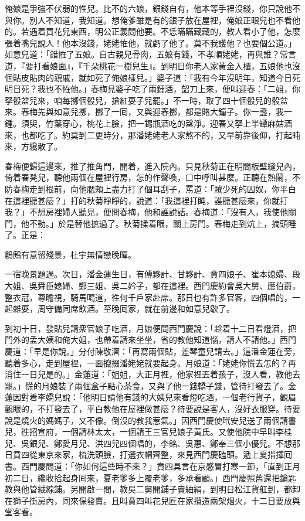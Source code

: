 俺娘是爭強不伏弱的性兒。比不的六娘，銀錢自有，他本等手裡沒錢，你只說他不與你。別人不知道，我知道。{}想俺爹雖是有的銀子放在屋裡，俺娘正眼兒也不看他的。若遇着買花兒東西，明公正義問他要。不恁瞞瞞藏藏的，教人看小了他，怎麼張着嘴兒說人！他本沒錢，姥姥恠他，就虧了他了。莫不我護他？也要個公道。」{}如意兒道：「錯恠了五娘。自古親兒骨肉，五娘有錢，不孝順姥姥，再與誰？常言道，『要打看娘面』，『千朵桃花一樹兒生』。{}到明日你老人家黃金入櫃，五娘他也沒個貼皮貼肉的親戚，就如死了俺娘樣兒。」婆子道：「我有今年沒明年，知道今日死明日死？我也不恠他。」春梅見婆子吃了兩鍾酒，韶刀上來，便叫迎春：「二姐，你拏骰盆兒來，咱每擲個骰兒，搶紅耍子兒罷。」不一時，取了四十個骰兒的骰盆來。春梅先與如意兒擲，擲了一囘，又與迎春擲，都是賭大鐘子。你一盞，我一鍾。須臾，竹葉穿心，桃花上臉，把一錫瓶酒吃的罄淨。{}迎春又拏上半罈麻姑酒來，也都吃了。約莫到二更時分，那潘姥姥老人家熬不的，又早前靠後仰，打起盹來，方纔散了。

春梅便歸這邊來，推了推角門，開着，進入院內。只見秋菊正在明間板壁縫兒內，倚着春凳兒，聽他兩個在屋裡行房，怎的作聲喚，口中呼叫甚麼。正聽在熱鬧，不防春梅走到根前，向他腮頰上盡力打了個耳刮子，罵道：「賊少死的囚奴，你平白在這裡聽甚麼？」打的秋菊睜睜的，說道：「我這裡打盹，誰聽甚麼來，你就打我？」不想房裡婦人聽見，便問春梅，他和誰說話。春梅道：「沒有人，我使他關門，他不動。」於是替他摭過了。秋菊揉着眼，關上房門。春梅走到炕上，摘頭睡了。正是：

\begin{myquote}
鶬鶊有意留殘景，杜宇無情戀晚暉。
\end{myquote}

一宿晚景題過。次日，潘金蓮生日，有傅夥計、甘夥計、賁四娘子、崔本媳婦、段大姐、吳舜臣媳婦、鄭三姐、吳二妗子，都在這裡。西門慶約會吳大舅、應伯爵，整衣冠，尊瞻視，騎馬喝道，徃何千戶家赴席。那日也有許多官客，四個唱的，一起雜耍，周守備同席飲酒。至晚囘家，就在前邊和如意兒歇了。

到初十日，發貼兒請衆官娘子吃酒，月娘便問西門慶說：「趁着十二日看燈酒，把門外的孟大姨和俺大姐，也帶着請來坐坐，省的教他知道惱，請人不請他。」西門慶道：「早是你說。」分付陳敬濟：「再寫兩個貼，差琴童兒請去。」這潘金蓮在旁，聽着多心，走到屋裡，一面攛掇潘姥姥就要起身。月娘道：「姥姥你慌去怎的？再消住一日兒是的。」金蓮道：「姐姐，大正月裡，他家裡丟着孩子，沒人看，教他去罷。」慌的月娘裝了兩個盒子點心茶食，又與了他一錢轎子錢，管待打發去了。金蓮因對着李嬌兒說：「他明日請他有錢的大姨兒來看燈吃酒，一個老行貨子，觀眉觀眼的，不打發去了，平白教他在屋裡做甚麼？待要說是客人，沒好衣服穿。待要說是燒火的媽媽子，又不像。倒沒的教我惹氣。」因西門慶使玳安兒送了兩個請書兒，徃招宣府，一個請林太太，一個請王三官兒娘子黃氏。又使他院中早叫李桂兒、吳銀兒、鄭愛月兒、洪四兒四個唱的，李銘、吳惠、鄭奉三個小優兒。不想那日賁四從東京來家，梳洗頭臉，打選衣帽齊整，來見西門慶磕頭。遞上夏指揮囘書。西門慶問道：「你如何這些時不來？」賁四具言在京感冒打寒一節，「直到正月初二日，纔收拾起身囘來，夏老爹多上覆老爹，多承看顧。」西門慶照舊還把鑰匙教與他管絨線鋪。另開啟一間，教吳二舅開鋪子賣紬絹，到明日松江貨舡到，都卸在獅子街房內，同來保發賣。且叫賁四叫花兒匠在家攢造兩架烟火，十二日要放與堂客看。

